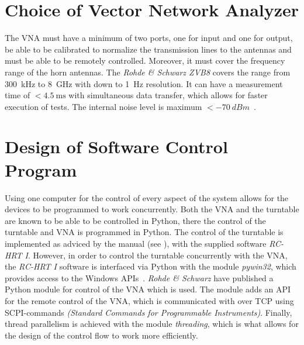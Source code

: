 
\section{Choice of Vector Network Analyzer}
The VNA must have a minimum of two ports, one for input and one for output, be able to be calibrated to normalize the transmission lines to the antennas and must be able to be remotely controlled. Moreover, it must cover the frequency range of the horn antennas. The \textit{Rohde \& Schwarz ZVB8} covers the range from \SI{300}{\kilo\hertz} to \SI{8}{\giga\hertz} with down to \SI{1}{\hertz} resolution. It can have a measurement time of $<\SI{4.5}{\milli\second}$ with simultaneous data transfer, which allows for faster execution of tests. The internal noise level is maximum $<-\SI{70}{dBm}$~\cite[p. 14]{vna_data_sheet_spec}.



\section{Design of Software Control Program}
Using one computer for the control of every aspect of the system allows for the devices to be programmed to work concurrently. Both the VNA and the turntable are known to be able to be controlled in Python, there the control of the turntable and VNA is programmed in Python. The control of the turntable is implemented as adviced by the manual (see \cite{hrt_i_manual}), with the supplied software \textit{RC-HRT I}. However, in order to control the turntable concurrently with the VNA, the \textit{RC-HRT I} software is interfaced via Python with the module \textit{pywin32}, which provides access to the Windows APIs~\cite{pywin32}. \textit{Rohde \& Schwarz} have published a Python module for control of the VNA which is used. The module adds an API for the remote control of the VNA, which is communicated with over TCP using SCPI-commands \textit{(Standard Commands for Programmable Instruments)}. Finally, thread parallelism is achieved with the module \textit{threading}, which is what allows for the design of the control flow to work more efficiently.



